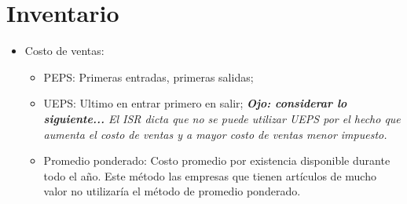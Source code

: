 \section{Inventario}
\begin{itemize}
    \item Costo de ventas:  
    \begin{itemize}
        \item PEPS: Primeras entradas, primeras salidas; 
        \item UEPS: Ultimo en entrar primero en salir; \emph{\textbf{Ojo: considerar lo siguiente...} El ISR dicta que no se puede utilizar UEPS por el hecho que aumenta el costo de ventas y a mayor costo de ventas menor impuesto.}
        \item Promedio ponderado: Costo promedio por existencia disponible durante todo el año. Este método las empresas que tienen artículos de mucho valor no utilizaría el método de promedio ponderado. 
    \end{itemize}
\end{itemize}

